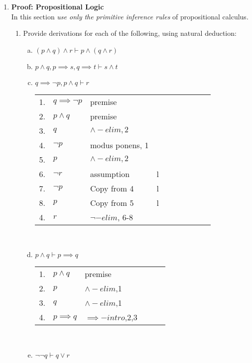 \documentclass{article}
\begin{document}
\begin{enumerate}[\bf I.]
\item \textbf{Proof: Propositional Logic} \\[6pt]
In this section {\em use only the primitive inference rules} of
propositional calculus.
\begin{enumerate}[1.] \setcounter{enumii}{0}
\item Provide derivations for each of the following, using natural
deduction:
\begin{enumerate}[a.]
 \item $(p \land q)\land r\vdash p \land (q \land r)$ \\
 \item $p \land q,p\implies s,q\implies t\vdash s\land t$ \\
 \item $q \implies \neg p,p\land q\vdash r$ \\
   \begin{tabular}{l ll lll llll}
     1. & $q \implies \neg p$ & premise \\
     2. & $p \land q$         & premise \\
     3. & $q$                 & $\land -elim, 2$ \\
     4. & $\neg p$            & modus ponens, 1 \\  
     5. & $p$                 & $\land -elim, 2$ \\
     6.	& $\neg r$            & assumption  & l\\ 
     7. & $\neg p$            & Copy from 4 & l\\
     8. & $p$                 & Copy from 5 & l\\
     4. & $r$                 & $\neg -elim$, 6-8 \\
   \end{tabular} \\
 \item $p \land q \vdash p \implies q$ \\
   \begin{tabular}{l ll lll}
     1. & $p \land q$ & premise \\
     2. & $p$         & $\land-elim$,1\\
     3. & $q$         & $\land-elim$,1\\
     4. & $p \implies q$ & $\implies-intro$,2,3 \\
   \end{tabular} \\
 \item $\neg\neg q \vdash q \lor r$ \\

\end{enumerate}
\end{enumerate}
\end{enumerate}
\end{document}
